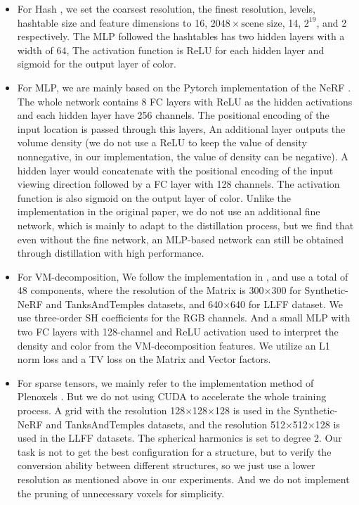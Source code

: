 \documentclass[letterpaper]{article} \usepackage{aaai23}  \usepackage{times}  \usepackage{helvet}  \usepackage{courier}  \usepackage[hyphens]{url}  \usepackage{graphicx} \urlstyle{rm} \def\UrlFont{\rm}  \usepackage{natbib}  \usepackage{caption} \frenchspacing  \setlength{\pdfpagewidth}{8.5in}  \setlength{\pdfpageheight}{11in}  \usepackage{multirow}
\begin{document}
\begin{itemize}
\item For Hash \cite{muller2022instant}, we set the coarsest resolution, the finest resolution, levels, hashtable size and feature dimensions to 16, $2048 \times \text{scene size}$, 14, $2^{19}$, and 2 respectively. The MLP followed the hashtables has two hidden layers with a width of 64, The activation function is ReLU for each hidden layer and sigmoid for the output layer of color.
\item For MLP, we are mainly based on the Pytorch implementation of the NeRF \cite{lin2020NeRFpytorch}. The whole network contains 8 FC layers with ReLU as the hidden activations and each hidden layer have 256 channels. The positional encoding of the input location is passed through this layers, An additional layer outputs the volume density (we do not use a ReLU to keep the value of density nonnegative, in our implementation, the value of density can be negative). A hidden layer would concatenate with the positional encoding of the input viewing direction followed by a FC layer with 128 channels. The activation function is also sigmoid on the output layer of color. Unlike the implementation in the original paper, we do not use an additional fine network, which is mainly to adapt to the distillation process, but we find that even without the fine network, an MLP-based network can still be obtained through distillation with high performance.
\item For VM-decomposition, We follow the implementation in \cite{chen2022tensorf}, and use a total of 48 components, where the resolution of the Matrix is 300$\times$300 for Synthetic-NeRF and TanksAndTemples datasets, and 640$\times$640 for LLFF dataset. We use three-order SH coefficients for the RGB channels. And a small MLP with two FC layers with 128-channel and ReLU activation used to interpret the density and color from the VM-decomposition features. We utilize an L1 norm loss and a TV loss on the Matrix and Vector factors.
\item For sparse tensors, we mainly refer to the implementation method of Plenoxels \cite{fridovich2022plenoxels}. But we do not using CUDA to accelerate the whole training process. A grid with the resolution 128$\times$128$\times$128 is used in the Synthetic-NeRF and TanksAndTemples datasets, and the resolution 512$\times$512$\times$128 is used in the LLFF datasets. The spherical harmonics is set to degree 2. Our task is not to get the best configuration for a structure, but to verify the conversion ability between different structures, so we just use a lower resolution as mentioned above in our experiments. And we do not implement the pruning of unnecessary voxels for simplicity.
\end{itemize}
\end{document}

